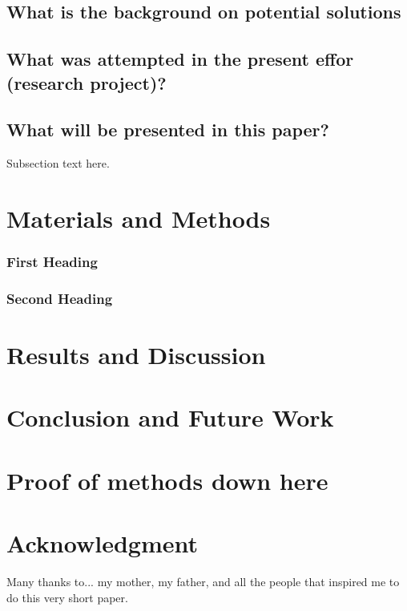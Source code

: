 \documentclass[journal]{./IEEE/IEEEtran}
\begin{document}
\subsection{What is the background on potential solutions}

\subsection{What was attempted in the present effor (research project)?}

\subsection{What will be presented in this paper?}
Subsection text here.

\section{Materials and Methods}

\subsubsection{First Heading}
\subsubsection{Second Heading}

\section{Results and Discussion}
\section{Conclusion and Future Work}
\appendices

\section{Proof of methods down here}

\section{}

\section*{Acknowledgment}
Many thanks to... my mother, my father, and all the people that inspired me to do this very short paper.
\end{document}
